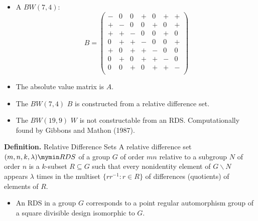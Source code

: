 \documentclass{beamer}
\newcommand{\rds}[1]{#1 \mymin RDS}
\begin{document}
\begin{frame}

  \begin{itemize}
  \item A $BW(7,4)$:
    \[
      B=
      \left(
        \begin{array}{ccccccc}
          -&0&0&+&0&+&+\\
          +&-&0&0&+&0&+\\
          +&+&-&0&0&+&0\\
          0&+&+&-&0&0&+\\
          +&0&+&+&-&0&0\\
          0&+&0&+&+&-&0\\
          0&0&+&0&+&+&-\\
        \end{array}
      \right)
    \]
  \item The absolute value matrix is $A$.
  \end{itemize}

\end{frame}

\begin{frame}

  \begin{itemize}
  \item The $BW(7,4)$ $B$ is constructed from a relative difference set.
  \item The $BW(19,9)$ $W$ is not constructable from an RDS. Computationally
    found by Gibbons and Mathon (1987).
  \end{itemize}

\end{frame}

\begin{frame}

  \begin{block}{{\bf Definition.} Relative Difference Sets}
    A relative difference set $\rds{(m,n,k,\lambda)}$ of a group $G$ of order
    $mn$ relative to a subgroup $N$ of order $n$ is a $k$-subset $R \subseteq G$
    such that every nonidentity element of $G \backslash N$ appears $\lambda$
    times in the multiset $\{rr^{-1} : r \in R\}$ of differences (quotients) of
    elements of $R$.
  \end{block}

  \begin{itemize}
  \item An RDS in a group $G$ corresponds to a point regular automorphism group
    of a square divisible design isomorphic to $G$.
  \end{itemize}

\end{frame}
\end{document}
